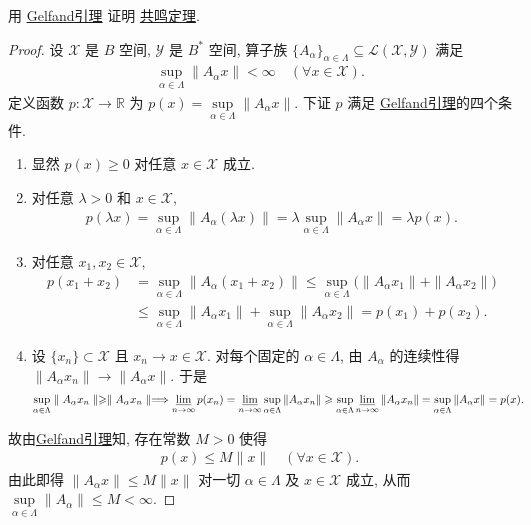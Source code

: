 \documentclass[../../main.tex]{subfiles}%
\begin{document}
\begin{example}
用 \hyperref[lemma:泛函分析--Gelfand引理]{Gelfand引理} 证明 \hyperref[theorem:泛函分析--共鸣定理]{共鸣定理}.
\end{example}
\begin{proof}
设 $\mathscr{X}$ 是 $B$ 空间, $\mathscr{Y}$ 是 $B^{*}$ 空间, 算子族 $\{A_{\alpha}\}_{\alpha\in\Lambda}\subseteq\mathscr{L}(\mathscr{X},\mathscr{Y})$ 满足
\begin{align*}
\sup\limits_{\alpha\in\Lambda}\|A_{\alpha}x\|<\infty\quad (\forall x\in\mathscr{X}).
\end{align*}
定义函数 $p:\mathscr{X}\to\mathbb{R}$ 为 $p(x)=\sup\limits_{\alpha\in\Lambda}\|A_{\alpha}x\|$. 下证 $p$ 满足 \hyperref[lemma:泛函分析--Gelfand引理]{Gelfand引理}的四个条件.
\begin{enumerate}[(1)]
\item 显然 $p(x)\geqslant 0$ 对任意 $x\in\mathscr{X}$ 成立.
\item 对任意 $\lambda>0$ 和 $x\in\mathscr{X}$,
\begin{align*}
p(\lambda x)=\sup\limits_{\alpha\in\Lambda}\|A_{\alpha}(\lambda x)\|
=\lambda\sup\limits_{\alpha\in\Lambda}\|A_{\alpha}x\|=\lambda p(x).
\end{align*}
\item 对任意 $x_{1},x_{2}\in\mathscr{X}$,
\begin{align*}
p(x_{1}+x_{2})
&=\sup\limits_{\alpha\in\Lambda}\|A_{\alpha}(x_{1}+x_{2})\|
\leqslant\sup\limits_{\alpha\in\Lambda}\bigl(\|A_{\alpha}x_{1}\|+\|A_{\alpha}x_{2}\|\bigr)\\
&\leqslant\sup\limits_{\alpha\in\Lambda}\|A_{\alpha}x_{1}\|+\sup\limits_{\alpha\in\Lambda}\|A_{\alpha}x_{2}\|
=p(x_{1})+p(x_{2}).
\end{align*}

\item 设 $\{x_{n}\}\subset\mathscr{X}$ 且 $x_{n}\to x\in\mathscr{X}$. 对每个固定的 $\alpha\in\Lambda$, 由 $A_{\alpha}$ 的连续性得 $\|A_{\alpha}x_{n}\|\to\|A_{\alpha}x\|$. 于是
\begin{align*}
\mathop {\mathrm{sup}} \limits_{\alpha \in \Lambda}\parallel A_{\alpha}x_n\parallel \geqslant \parallel A_{\alpha}x_n\parallel \Longrightarrow \varliminf\limits_{n\to\infty}p(x_{n})
&=\varliminf\limits_{n\to\infty}\sup\limits_{\alpha\in\Lambda}\|A_{\alpha}x_{n}\|
\geqslant\sup\limits_{\alpha\in\Lambda}\varliminf\limits_{n\to\infty}\|A_{\alpha}x_{n}\|
=\sup\limits_{\alpha\in\Lambda}\|A_{\alpha}x\|=p(x).
\end{align*}
\end{enumerate}
故由\hyperref[lemma:泛函分析--Gelfand引理]{Gelfand引理}知, 存在常数 $M>0$ 使得
\begin{align*}
p(x)\leqslant M\|x\|\quad (\forall x\in\mathscr{X}).
\end{align*}
由此即得 $\|A_{\alpha}x\|\leqslant M\|x\|$ 对一切 $\alpha\in\Lambda$ 及 $x\in\mathscr{X}$ 成立, 从而 $\sup\limits_{\alpha\in\Lambda}\|A_{\alpha}\|\leqslant M<\infty$.
\end{proof}
\end{document}
